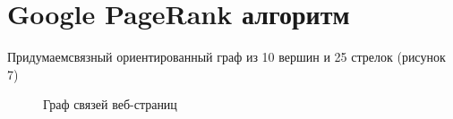 \documentclass[a5paper, 10pt]{article}
\theoremstyle{definition}
\theoremstyle{plain}
\theoremstyle{remark}
\begin{document}
\section{Google PageRank алгоритм}
Придумаемсвязный ориентированный граф из 10 вершин и 25 стрелок (рисунок 7)
\begin{figure}[h!]
\caption{Граф связей веб-страниц}
\end{figure}
\end{document}
